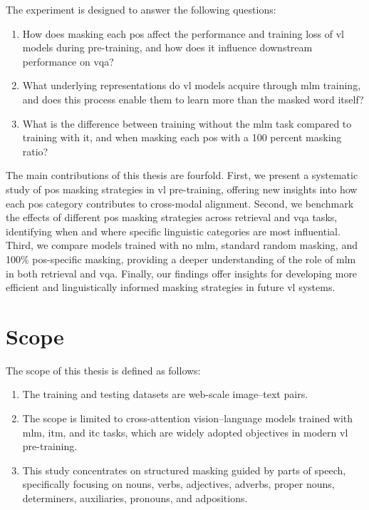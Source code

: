 The experiment is designed to answer the following questions:
\begin{enumerate}  
    \item How does masking each \acrshort{pos} affect the performance and training loss of \acrshort{vl} models during pre-training, and how does it influence downstream performance on \acrfull{vqa}?
    \item What underlying representations do \acrshort{vl} models acquire through \acrshort{mlm} training, and does this process enable them to learn more than the masked word itself?
    \item What is the difference between training without the \acrshort{mlm} task compared to training with it, and when masking each \acrshort{pos} with a 100 percent masking ratio?
\end{enumerate}

The main contributions of this thesis are fourfold.
First, we present a systematic study of \acrshort{pos} masking strategies in \acrshort{vl} pre-training, offering new insights into how each \acrshort{pos} category contributes to cross-modal alignment.  
Second, we benchmark the effects of different \acrshort{pos} masking strategies across retrieval and \acrshort{vqa} tasks, identifying when and where specific linguistic categories are most influential.  
Third, we compare models trained with no \acrshort{mlm}, standard random masking, and 100\% \acrshort{pos}-specific masking, providing a deeper understanding of the role of \acrshort{mlm} in both retrieval and \acrshort{vqa}.  
Finally, our findings offer insights for developing more efficient and linguistically informed masking strategies in future \acrshort{vl} systems.  



\section{Scope}  
The scope of this thesis is defined as follows:  
\begin{enumerate}  
    \item The training and testing datasets are web-scale image–text pairs.  
    \item The scope is limited to cross-attention vision–language models trained with \acrshort{mlm}, \acrshort{itm}, and \acrshort{itc} tasks, which are widely adopted objectives in modern \acrshort{vl} pre-training.
    \item This study concentrates on structured masking guided by parts of speech, specifically focusing on nouns, verbs, adjectives, adverbs, proper nouns, determiners, auxiliaries, pronouns, and adpositions.
\end{enumerate}  